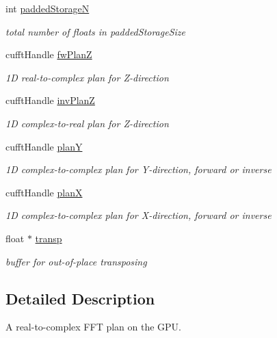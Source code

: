 \begin{DoxyCompactItemize}
int \hyperlink{structgpu__plan3d__real__input_ac2ab3705948b428a3db89126c7610964}{paddedStorageN}
\begin{DoxyCompactList}\small\item\em total number of floats in paddedStorageSize \item\end{DoxyCompactList}\item 
cufftHandle \hyperlink{structgpu__plan3d__real__input_ae39275ea173f7d06fe87cf75bd1ca0b2}{fwPlanZ}
\begin{DoxyCompactList}\small\item\em 1D real-\/to-\/complex plan for Z-\/direction \item\end{DoxyCompactList}\item 
cufftHandle \hyperlink{structgpu__plan3d__real__input_a91b425c652f16c10a152dcff097a5b04}{invPlanZ}
\begin{DoxyCompactList}\small\item\em 1D complex-\/to-\/real plan for Z-\/direction \item\end{DoxyCompactList}\item 
cufftHandle \hyperlink{structgpu__plan3d__real__input_a7721fe049fc152d3bc0ade13c4f4426b}{planY}
\begin{DoxyCompactList}\small\item\em 1D complex-\/to-\/complex plan for Y-\/direction, forward or inverse \item\end{DoxyCompactList}\item 
cufftHandle \hyperlink{structgpu__plan3d__real__input_a57752f1567bc689ad71d8e3e8017ec4a}{planX}
\begin{DoxyCompactList}\small\item\em 1D complex-\/to-\/complex plan for X-\/direction, forward or inverse \item\end{DoxyCompactList}\item 
float $\ast$ \hyperlink{structgpu__plan3d__real__input_ac51425f669e3169308d1b1126008ee09}{transp}
\begin{DoxyCompactList}\small\item\em buffer for out-\/of-\/place transposing \item\end{DoxyCompactList}\end{DoxyCompactItemize}


\subsection{Detailed Description}
A real-\/to-\/complex FFT plan on the GPU. 

